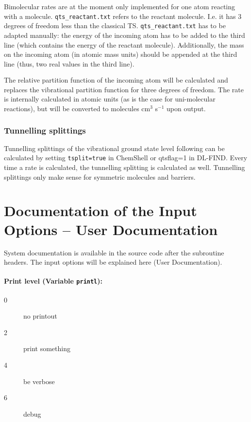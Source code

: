 \documentclass{article}
\begin{document}
Bimolecular rates are at the moment only implemented for one atom reacting
with a molecule. \texttt{qts\_reactant.txt} refers to the reactant molecule. I.e. it
has 3 degrees of freedom less than the classical TS. \texttt{qts\_reactant.txt} has to
be adapted manually: the energy of the incoming atom has to be added to the
third line (which contains the energy of the reactant molecule). Additionally,
the mass on the incoming atom (in atomic mass units) should be appended at the
third line (thus, two real values in the third line).

The relative partition function of the incoming atom will be calculated and
replaces the vibrational partition function for three degrees of freedom. The
rate is internally calculated in atomic units (as is the case for uni-molecular
reactions), but will be converted to molecules cm$^3$ s$^{-1}$ upon output.

\subsubsection{Tunnelling splittings}

Tunnelling splittings of the vibrational ground state level following
\cite{ric11} can be calculated by setting \texttt{tsplit=true} in ChemShell or
qtsflag=1 in DL-FIND. Every time a rate is calculated, the tunnelling splitting
is calculated as well. Tunnelling splittings only make sense for
symmetric molecules and barriers.

\newpage
\clearpage
\section{Documentation of the Input Options -- User Documentation}

System documentation is available in the source code after the subroutine
headers. The input options will be explained here (User Documentation).

\paragraph{Print level (Variable \texttt{printl}):}
\begin{description}
\item[0] no printout
\item[2] print something
\item[4] be verbose
\item[6] debug
\end{description}
\end{document}
